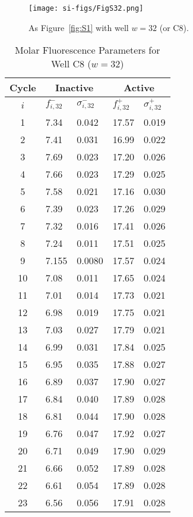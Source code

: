                 \begin{figure}
                    \centering
                    \texttt{[image: si-figs/FigS32.png]}
                    \caption{
                        As Figure~\ref{fig:S1} with well $w=32$ (or C8).
                    }
                \end{figure}
                \clearpage
    \begin{table}
        \caption{Molar Fluorescence Parameters for Well C8 ($w=32$)}
        \centering
        \begin{tabular}{c|ll|ll}
            Cycle & \multicolumn{2}{c|}{Inactive} & \multicolumn{2}{c}{Active} \\
            \hline
            $i$ & $f_{i,32}^{-}$ & $\sigma_{i,32}^{-}$ &  $f_{i,32}^{+}$ & $\sigma_{i,32}^{+}$ \\
            \hline
    1 & 7.34 & 0.042 & 17.57 & 0.019 \\
2 & 7.41 & 0.031 & 16.99 & 0.022 \\
3 & 7.69 & 0.023 & 17.20 & 0.026 \\
4 & 7.66 & 0.023 & 17.29 & 0.025 \\
5 & 7.58 & 0.021 & 17.16 & 0.030 \\
6 & 7.39 & 0.023 & 17.26 & 0.029 \\
7 & 7.32 & 0.016 & 17.41 & 0.026 \\
8 & 7.24 & 0.011 & 17.51 & 0.025 \\
9 & 7.155 & 0.0080 & 17.57 & 0.024 \\
10 & 7.08 & 0.011 & 17.65 & 0.024 \\
11 & 7.01 & 0.014 & 17.73 & 0.021 \\
12 & 6.98 & 0.019 & 17.75 & 0.021 \\
13 & 7.03 & 0.027 & 17.79 & 0.021 \\
14 & 6.99 & 0.031 & 17.84 & 0.025 \\
15 & 6.95 & 0.035 & 17.88 & 0.027 \\
16 & 6.89 & 0.037 & 17.90 & 0.027 \\
17 & 6.84 & 0.040 & 17.89 & 0.028 \\
18 & 6.81 & 0.044 & 17.90 & 0.028 \\
19 & 6.76 & 0.047 & 17.92 & 0.027 \\
20 & 6.71 & 0.049 & 17.90 & 0.029 \\
21 & 6.66 & 0.052 & 17.89 & 0.028 \\
22 & 6.61 & 0.054 & 17.89 & 0.028 \\
23 & 6.56 & 0.056 & 17.91 & 0.028 \\

\end{tabular}
\end{table}
